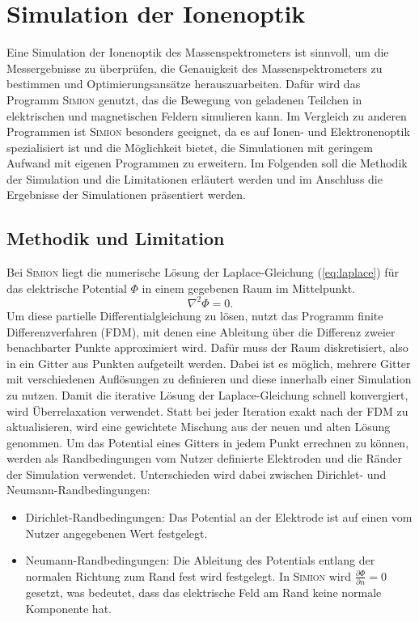 \chapter{Simulation der Ionenoptik}
\label{chap:Simulation}
Eine Simulation der Ionenoptik des Massenspektrometers ist sinnvoll, um die Messergebnisse zu überprüfen, die Genauigkeit des Massenspektrometers zu bestimmen und Optimierungsansätze herauszuarbeiten. Dafür wird das Programm \textsc{Simion} genutzt, das die Bewegung von geladenen Teilchen in elektrischen und magnetischen Feldern simulieren kann. Im Vergleich zu anderen Programmen ist \textsc{Simion} besonders geeignet, da es auf Ionen- und Elektronenoptik spezialisiert ist und die Möglichkeit bietet, die Simulationen mit geringem Aufwand mit eigenen Programmen zu erweitern. Im Folgenden soll die Methodik der Simulation und die Limitationen erläutert werden und im Anschluss die Ergebnisse der Simulationen präsentiert werden.

\section{Methodik und Limitation}
Bei \textsc{Simion} liegt die numerische Lösung der Laplace-Gleichung (\ref{eq:laplace}) für das elektrische Potential $\Phi$ in einem gegebenen Raum \cite{SIMION} im Mittelpunkt.
\begin{equation}
    \label{eq:laplace}
    \nabla^2 \Phi = 0.
\end{equation}
Um diese partielle Differentialgleichung zu lösen, nutzt das Programm finite Differenzverfahren (FDM), mit denen eine Ableitung über die Differenz zweier benachbarter Punkte approximiert wird. Dafür muss der Raum diskretisiert, also in ein Gitter aus Punkten aufgeteilt werden. Dabei ist es möglich, mehrere Gitter mit verschiedenen Auflösungen zu definieren und diese innerhalb einer Simulation zu nutzen. Damit die iterative Lösung der Laplace-Gleichung schnell konvergiert, wird Überrelaxation verwendet. Statt bei jeder Iteration exakt nach der FDM zu aktualisieren, wird eine gewichtete Mischung aus der neuen und alten Lösung genommen. Um das Potential eines Gitters in jedem Punkt errechnen zu können, werden als Randbedingungen vom Nutzer definierte Elektroden und die Ränder der Simulation verwendet. Unterschieden wird dabei zwischen Dirichlet- und Neumann-Randbedingungen:
\begin{itemize}
    \item {Dirichlet-Randbedingungen:} Das Potential an der Elektrode ist auf einen vom Nutzer angegebenen Wert festgelegt.
    \item {Neumann-Randbedingungen:} Die Ableitung des Potentials entlang der normalen Richtung zum Rand fest wird festgelegt. In \textsc{Simion} wird $\frac{\partial \Phi}{\partial n} = 0$ gesetzt, was bedeutet, dass das elektrische Feld am Rand keine normale Komponente hat.
\end{itemize}

